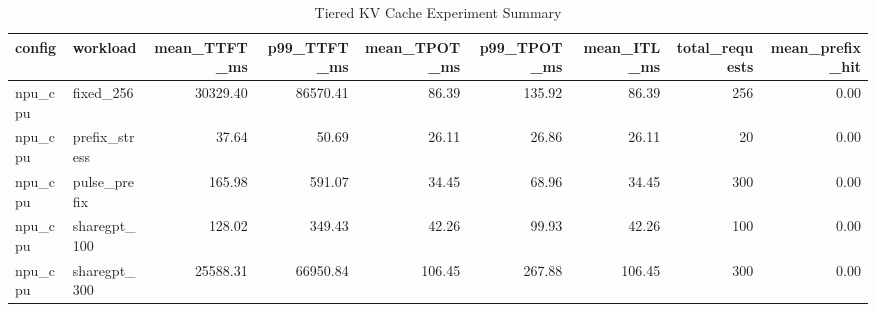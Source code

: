 \begin{table}
\caption{Tiered KV Cache Experiment Summary}
\label{tab:tiered_kv_summary}
\begin{tabular}{llrrrrrrr}
\toprule
config & workload & mean_TTFT_ms & p99_TTFT_ms & mean_TPOT_ms & p99_TPOT_ms & mean_ITL_ms & total_requests & mean_prefix_hit \\
\midrule
npu_cpu & fixed_256 & 30329.40 & 86570.41 & 86.39 & 135.92 & 86.39 & 256 & 0.00 \\
npu_cpu & prefix_stress & 37.64 & 50.69 & 26.11 & 26.86 & 26.11 & 20 & 0.00 \\
npu_cpu & pulse_prefix & 165.98 & 591.07 & 34.45 & 68.96 & 34.45 & 300 & 0.00 \\
npu_cpu & sharegpt_100 & 128.02 & 349.43 & 42.26 & 99.93 & 42.26 & 100 & 0.00 \\
npu_cpu & sharegpt_300 & 25588.31 & 66950.84 & 106.45 & 267.88 & 106.45 & 300 & 0.00 \\
\bottomrule
\end{tabular}
\end{table}
